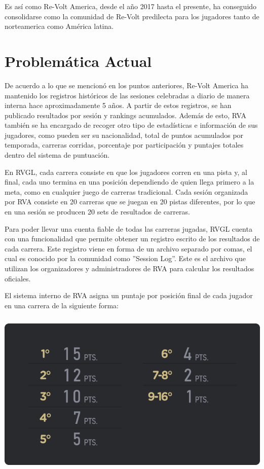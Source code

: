 Es así como Re-Volt America, desde el año 2017 hasta el presente, ha conseguido consolidarse como la comunidad de Re-Volt predilecta para los jugadores tanto de norteamerica como América latina.

\section{Problemática Actual}
De acuerdo a lo que se mencionó en los puntos anteriores, Re-Volt America ha mantenido los registros históricos de las sesiones celebradas a diario de manera interna hace aproximadamente 5 años. A partir de estos registros, se han publicado resultados por sesión y rankings acumulados. Además de esto, RVA también se ha encargado de recoger otro tipo de estadísticas e información de sus jugadores, como pueden ser su nacionalidad, total de puntos acumulados por temporada, carreras corridas, porcentaje por participación y puntajes totales dentro del sistema de puntuación.

En RVGL, cada carrera consiste en que los jugadores corren en una pista y, al final, cada uno termina en una posición dependiendo de quien llega primero a la meta, como en cualquier juego de carreras tradicional. Cada sesión organizada por RVA consiste en 20 carreras que se juegan en 20 pistas diferentes, por lo que en una sesión se producen 20 sets de resultados de carreras.

Para poder llevar una cuenta fiable de todas las carreras jugadas, RVGL cuenta con una funcionalidad que permite obtener un registro escrito de los resultados de cada carrera. Este registro viene en forma de un  archivo separado por comas, el cual es conocido por la comunidad como ''Session Log''. Este es el archivo que utilizan los organizadores y administradores de RVA para calcular los resultados oficiales.

El sistema interno de RVA asigna un puntaje por posición final de cada jugador en una carrera de la siguiente forma:

\includegraphics[width=15cm, height=8cm]{img/points.png}

